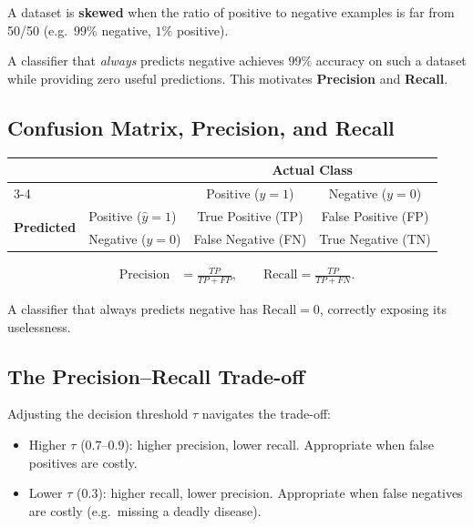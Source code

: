 \begin{definition}
A dataset is \textbf{skewed} when the ratio of positive to negative examples
is far from 50/50 (e.g.\ $99\%$ negative, $1\%$ positive).
\end{definition}

A classifier that \emph{always} predicts negative achieves $99\%$ accuracy
on such a dataset while providing zero useful predictions. This motivates
\textbf{Precision} and \textbf{Recall}.

\subsection{Confusion Matrix, Precision, and Recall}

\begin{center}
\begin{tabular}{llcc}
\toprule
& & \multicolumn{2}{c}{\textbf{Actual Class}}\\
\cmidrule{3-4}
& & Positive ($y=1$) & Negative ($y=0$)\\
\midrule
\multirow{2}{*}{\textbf{Predicted}} & Positive ($\hat{y}=1$) &
True Positive (TP) & False Positive (FP)\\
& Negative ($\hat{y}=0$) & False Negative (FN) & True Negative (TN)\\
\bottomrule
\end{tabular}
\end{center}

\begin{align}
\text{Precision}&=\frac{TP}{TP+FP},\qquad
\text{Recall}=\frac{TP}{TP+FN}.
\end{align}

A classifier that always predicts negative has $\text{Recall}=0$, correctly
exposing its uselessness.

\subsection{The Precision--Recall Trade-off}

Adjusting the decision threshold $\tau$ navigates the trade-off:
\begin{itemize}
\item Higher $\tau$ ($0.7$--$0.9$): higher precision, lower recall.
  Appropriate when false positives are costly.
\item Lower $\tau$ ($0.3$): higher recall, lower precision.
  Appropriate when false negatives are costly (e.g.\ missing a deadly disease).
\end{itemize}

